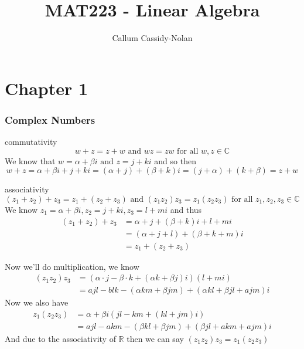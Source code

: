 \documentclass[11pt]{book}
\title{MAT223 - Linear Algebra}
\author{Callum Cassidy-Nolan}
\begin{document}
\chapter*{Chapter 1}%
\label{chp:1}

\subsection*{Complex Numbers}%
\label{sub:complex_numbers}

\begin{ver}
    commutativity
    \begin{equation*}
        w + z = z + w \text{ and } wz = zw \text{ for all } w, z \in \mathbb{C}
    \end{equation*}
    We know that $w = \alpha + \beta i  \text{ and } z = j + k i  $ and so then 
    \begin{equation*}
        w + z = \alpha + \beta i + j + k i = \left( \alpha + j \right) + \left( \beta +k \right)i = \left( j + \alpha  \right) + \left( k + \beta  \right) = z + w
    \end{equation*}
\end{ver}

\begin{ver}
    associativity 
    \begin{equation*}
        \left( z_1 + z_2 \right) + z_3 = z_1 + \left( z_2 + z_3 \right) \text{ and } \left( z_1 z_2 \right)z_3 = z_1\left( z_2z_3 \right) \text{ for all } z_1, z_2, z_3 \in \mathbb{C}
    \end{equation*}
    We know $z_1 = \alpha + \beta i, z_2 = j + k i, z_3 = l + m i$ and thus 
    \begin{align*}
        \left( z_1 + z_2 \right) + z_3 &= \alpha  + j + \left( \beta  + k \right) i + l + m i \\
                                       &= \left( \alpha + j + l \right) + \left( \beta + k + m \right) i \\
                                       &= z_1 + \left( z_2 + z_3 \right) 
    \end{align*}

    Now we'll do multiplication, we know
    \begin{align*}
        \left( z_1z_2 \right)z_3 &= \left(   \alpha  \cdot j - \beta  \cdot k + \left( \alpha k + \beta j \right) i \right) \left( l + m i \right) \\
                                 &= ajl - blk - \left( \alpha km + \beta jm \right) + \left( \alpha kl + \beta jl + ajm \right) i
    \end{align*}
    Now we also have
    \begin{align*}
        z_1\left( z_2z_3 \right) &= \alpha + \beta i\left( jl - km + \left( kl + jm \right)i \right)\\
                                 &= ajl - akm - \left( \beta kl + \beta jm \right) + \left( \beta jl + akm + ajm \right) i
    \end{align*}
    And due to the associativity of $\mathbb{R}$ then we can say $\left( z_1z_2 \right)z_3 = z_1 \left( z_2z_3 \right)$ 
\end{ver}
\end{document}
